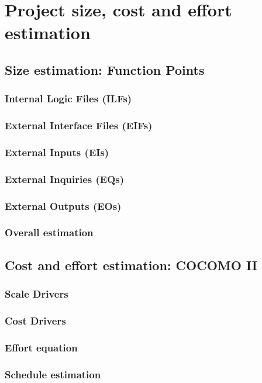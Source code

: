 \section{Project size, cost and effort estimation}

\subsection{Size estimation: Function Points}

\subsubsection{Internal Logic Files (ILFs)}

\subsubsection{External Interface Files (EIFs)}

\subsubsection{External Inputs (EIs)}

\subsubsection{External Inquiries (EQs)}
 
\subsubsection{External Outputs (EOs)} 

\subsubsection{Overall estimation}

\subsection{Cost and effort estimation: COCOMO II} 

\subsubsection{Scale Drivers}

\subsubsection{Cost Drivers}

\subsubsection{Effort equation}

\subsubsection{Schedule estimation }